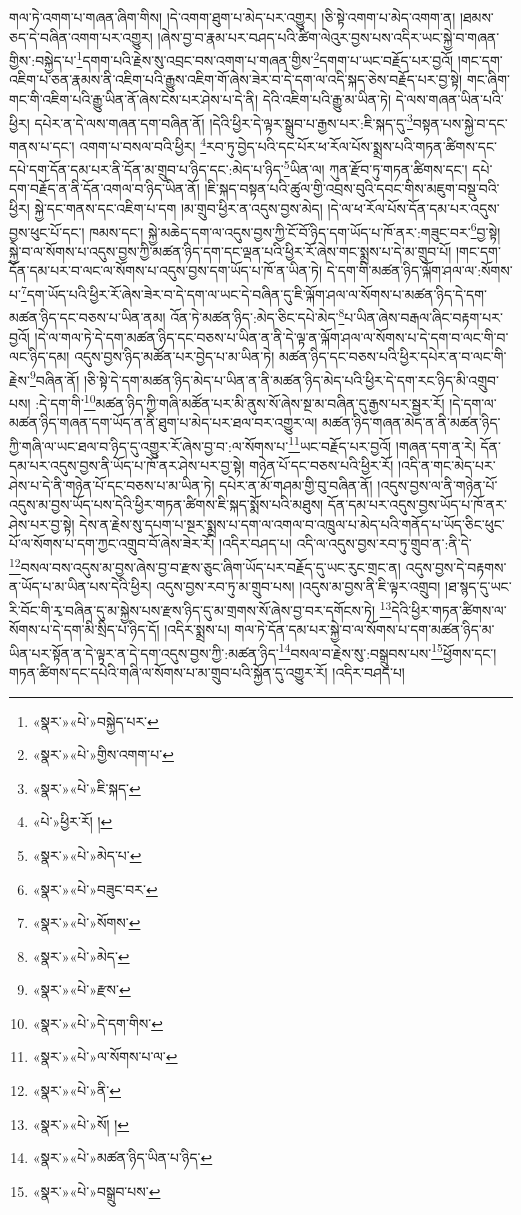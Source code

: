 གལ་ཏེ་འགག་པ་གཞན་ཞིག་གིས། །དེ་འགག་ཐུག་པ་མེད་པར་འགྱུར། །ཅི་སྟེ་འགག་པ་མེད་འགག་ན། །ཐམས་ཅད་དེ་བཞིན་འགག་པར་འགྱུར། །ཞེས་བྱ་བ་རྣམ་པར་བཤད་པའི་ཚིག་ལེའུར་བྱས་པས་འདིར་ཡང་སྐྱེ་བ་གཞན་གྱིས་:བསྐྱེད་པ་\footnote{«སྣར་»«པེ་»བསྐྱེད་པར་}དགག་པའི་རྗེས་སུ་འབྲང་བས་འགག་པ་གཞན་གྱིས་\footnote{«སྣར་»«པེ་»གྱིས་འགག་པ་}དགག་པ་ཡང་བརྗོད་པར་བྱའོ། །གང་དག་འཇིག་པ་ཅན་རྣམས་ནི་འཇིག་པའི་རྒྱུས་འཇིག་གོ་ཞེས་ཟེར་བ་དེ་དག་ལ་འདི་སྐད་ཅེས་བརྗོད་པར་བྱ་སྟེ། གང་ཞིག་གང་གི་འཇིག་པའི་རྒྱུ་ཡིན་ནོ་ཞེས་ངེས་པར་ཤེས་པ་དེ་ནི། དེའི་འཇིག་པའི་རྒྱུ་མ་ཡིན་ཏེ། དེ་ལས་གཞན་ཡིན་པའི་ཕྱིར། དཔེར་ན་དེ་ལས་གཞན་དག་བཞིན་ནོ། །དེའི་ཕྱིར་དེ་ལྟར་སྒྲུབ་པ་རྒྱས་པར་:ཇི་སྐད་དུ་\footnote{«སྣར་»«པེ་»ཇི་སྐད་}བསྟན་པས་སྐྱེ་བ་དང་གནས་པ་དང་། འགག་པ་བསལ་བའི་ཕྱིར། \footnote{«པེ་»ཕྱིར་རོ། ། }རབ་ཏུ་བྱེད་པའི་དང་པོར་ཕ་རོལ་པོས་སྨྲས་པའི་གཏན་ཚིགས་དང་དཔེ་དག་དོན་དམ་པར་ནི་དོན་མ་གྲུབ་པ་ཉིད་དང་:མེད་པ་ཉིད་\footnote{«སྣར་»«པེ་»མེད་པ་}ཡིན་ལ། ཀུན་རྫོབ་ཏུ་གཏན་ཚིགས་དང་། དཔེ་དག་བརྗོད་ན་ནི་དོན་འགལ་བ་ཉིད་ཡིན་ནོ། །ཇི་སྐད་བསྟན་པའི་ཚུལ་གྱི་འབྲས་བུའི་དབང་གིས་མཇུག་བསྡུ་བའི་ཕྱིར། སྐྱེ་དང་གནས་དང་འཇིག་པ་དག །མ་གྲུབ་ཕྱིར་ན་འདུས་བྱས་མེད། །དེ་ལ་ཕ་རོལ་པོས་དོན་དམ་པར་འདུས་བྱས་ཕུང་པོ་དང་། ཁམས་དང་། སྐྱེ་མཆེད་དག་ལ་འདུས་བྱས་ཀྱི་ངོ་བོ་ཉིད་དག་ཡོད་པ་ཁོ་ནར་:གཟུང་བར་\footnote{«སྣར་»«པེ་»བཟུང་བར་}བྱ་སྟེ། སྐྱེ་བ་ལ་སོགས་པ་འདུས་བྱས་ཀྱི་མཚན་ཉིད་དག་དང་ལྡན་པའི་ཕྱིར་རོ་ཞེས་གང་སྨྲས་པ་དེ་མ་གྲུབ་པོ། །གང་དག་དོན་དམ་པར་བ་ལང་ལ་སོགས་པ་འདུས་བྱས་དག་ཡོད་པ་ཁོ་ན་ཡིན་ཏེ། དེ་དག་གི་མཚན་ཉིད་ལྐོག་ཤལ་ལ་:སོགས་པ་\footnote{«སྣར་»«པེ་»སོགས་}དག་ཡོད་པའི་ཕྱིར་རོ་ཞེས་ཟེར་བ་དེ་དག་ལ་ཡང་དེ་བཞིན་དུ་ཇི་ལྐོག་ཤལ་ལ་སོགས་པ་མཚན་ཉིད་དེ་དག་མཚན་ཉིད་དང་བཅས་པ་ཡིན་ནམ། འོན་ཏེ་མཚན་ཉིད་:མེད་ཅིང་དཔེ་མེད་\footnote{«སྣར་»«པེ་»མེད་}པ་ཡིན་ཞེས་བརྒལ་ཞིང་བརྟག་པར་བྱའོ། །དེ་ལ་གལ་ཏེ་དེ་དག་མཚན་ཉིད་དང་བཅས་པ་ཡིན་ན་ནི་དེ་ལྟ་ན་ལྐོག་ཤལ་ལ་སོགས་པ་དེ་དག་བ་ལང་གི་བ་ལང་ཉིད་དམ། འདུས་བྱས་ཉིད་མཚོན་པར་བྱེད་པ་མ་ཡིན་ཏེ། མཚན་ཉིད་དང་བཅས་པའི་ཕྱིར་དཔེར་ན་བ་ལང་གི་རྗེས་\footnote{«སྣར་»«པེ་»རྫས་}བཞིན་ནོ། །ཅི་སྟེ་དེ་དག་མཚན་ཉིད་མེད་པ་ཡིན་ན་ནི་མཚན་ཉིད་མེད་པའི་ཕྱིར་དེ་དག་རང་ཉིད་མི་འགྲུབ་པས། :དེ་དག་གི་\footnote{«སྣར་»«པེ་»དེ་དག་གིས་}མཚན་ཉིད་ཀྱི་གཞི་མཚོན་པར་མི་ནུས་སོ་ཞེས་སྔ་མ་བཞིན་དུ་རྒྱས་པར་སྦྱར་རོ། །དེ་དག་ལ་མཚན་ཉིད་གཞན་དག་ཡོད་ན་ནི་ཐུག་པ་མེད་པར་ཐལ་བར་འགྱུར་ལ། མཚན་ཉིད་གཞན་མེད་ན་ནི་མཚན་ཉིད་ཀྱི་གཞི་ལ་ཡང་ཐལ་བ་ཉིད་དུ་འགྱུར་རོ་ཞེས་བྱ་བ་:ལ་སོགས་པ་\footnote{«སྣར་»«པེ་»ལ་སོགས་པ་ལ་}ཡང་བརྗོད་པར་བྱའོ། །གཞན་དག་ན་རེ། དོན་དམ་པར་འདུས་བྱས་ནི་ཡོད་པ་ཁོ་ནར་ཤེས་པར་བྱ་སྟེ། གཉེན་པོ་དང་བཅས་པའི་ཕྱིར་རོ། །འདི་ན་གང་མེད་པར་ཤེས་པ་དེ་ནི་གཉེན་པོ་དང་བཅས་པ་མ་ཡིན་ཏེ། དཔེར་ན་མོ་གཤམ་གྱི་བུ་བཞིན་ནོ། །འདུས་བྱས་ལ་ནི་གཉེན་པོ་འདུས་མ་བྱས་ཡོད་པས་དེའི་ཕྱིར་གཏན་ཚིགས་ཇི་སྐད་སྨོས་པའི་མཐུས། དོན་དམ་པར་འདུས་བྱས་ཡོད་པ་ཁོ་ནར་ཤེས་པར་བྱ་སྟེ། དེས་ན་རྗེས་སུ་དཔག་པ་སྔར་སྨྲས་པ་དག་ལ་འགལ་བ་འཁྲུལ་པ་མེད་པའི་གནོད་པ་ཡོད་ཅིང་ཕུང་པོ་ལ་སོགས་པ་དག་ཀྱང་འགྲུབ་བོ་ཞེས་ཟེར་རོ། །འདིར་བཤད་པ། འདི་ལ་འདུས་བྱས་རབ་ཏུ་གྲུབ་ན་:ནི་དེ་\footnote{«སྣར་»«པེ་»ནི་}བསལ་བས་འདུས་མ་བྱས་ཞེས་བྱ་བ་རྫས་ཅུང་ཞིག་ཡོད་པར་བརྗོད་དུ་ཡང་རུང་གྲང་ན། འདུས་བྱས་དེ་བརྟགས་ན་ཡོད་པ་མ་ཡིན་པས་དེའི་ཕྱིར། འདུས་བྱས་རབ་ཏུ་མ་གྲུབ་པས། །འདུས་མ་བྱས་ནི་ཇི་ལྟར་འགྲུབ། །ཐ་སྙད་དུ་ཡང་རི་བོང་གི་རྭ་བཞིན་དུ་མ་སྐྱེས་པས་རྫས་ཉིད་དུ་མ་གྲགས་སོ་ཞེས་བྱ་བར་དགོངས་ཏེ། \footnote{«སྣར་»«པེ་»སོ། ། }དེའི་ཕྱིར་གཏན་ཚིགས་ལ་སོགས་པ་དེ་དག་མི་སྲིད་པ་ཉིད་དོ། །འདིར་སྨྲས་པ། གལ་ཏེ་དོན་དམ་པར་སྐྱེ་བ་ལ་སོགས་པ་དག་མཚན་ཉིད་མ་ཡིན་པར་སྟོན་ན་དེ་ལྟར་ན་དེ་དག་འདུས་བྱས་ཀྱི་:མཚན་ཉིད་\footnote{«སྣར་»«པེ་»མཚན་ཉིད་ཡིན་པ་ཉིད་}བསལ་བ་རྗེས་སུ་:བསྒྲུབས་པས་\footnote{«སྣར་»«པེ་»བསྒྲུབ་པས་}ཕྱོགས་དང་། གཏན་ཚིགས་དང་དཔེའི་གཞི་ལ་སོགས་པ་མ་གྲུབ་པའི་སྐྱོན་དུ་འགྱུར་རོ། །འདིར་བཤད་པ། 